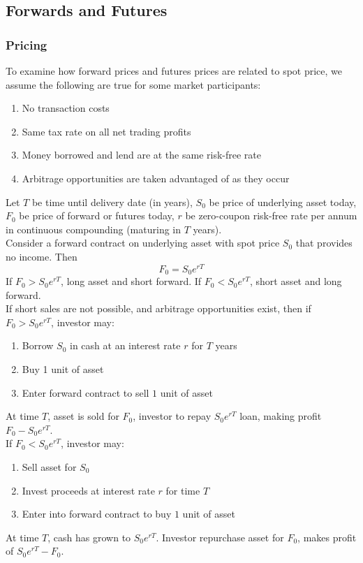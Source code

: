 \subsection{Forwards and Futures}

\subsubsection{Pricing}

To examine how forward prices and futures prices are related to spot price, we assume the following are true for some market participants:
\begin{enumerate}[label=\roman*.]
\setlength{\itemsep}{0pt}
\item No transaction costs
\item Same tax rate on all net trading profits
\item Money borrowed and lend are at the same risk-free rate
\item Arbitrage opportunities are taken advantaged of as they occur
\end{enumerate}

Let $T$ be time until delivery date (in years), $S_0$ be price of underlying asset today, $F_0$ be price of forward or futures today, $r$ be zero-coupon risk-free rate per annum in continuous compounding (maturing in $T$ years).\\

Consider a forward contract on underlying asset with spot price $S_0$ that provides no income. Then
\begin{equation}
F_0 = S_0 e^{rT} \nonumber
\end{equation}
If $F_0 > S_0 e^{rT}$, long asset and short forward. If $F_0 < S_0 e^{rT}$, short asset and long forward.\\
If short sales are not possible, and arbitrage opportunities exist, then if $F_0 > S_0 e^{rT}$, investor may:
\begin{enumerate}[label=\arabic*.]
\setlength{\itemsep}{0pt}
\item Borrow $S_0$ in cash at an interest rate $r$ for $T$ years
\item Buy 1 unit of asset
\item Enter forward contract to sell $1$ unit of asset
\end{enumerate}
At time $T$, asset is sold for $F_0$, investor to repay $S_0 e^{rT}$ loan, making profit $F_0 - S_0 e^{rT}$.\\
If $F_0 < S_0 e^{rT}$, investor may:
\begin{enumerate}[label=\arabic*.]
\setlength{\itemsep}{0pt}
\item Sell asset for $S_0$
\item Invest proceeds at interest rate $r$ for time $T$
\item Enter into forward contract to buy $1$ unit of asset
\end{enumerate}
At time $T$, cash has grown to $S_0 e^{rT}$. Investor repurchase asset for $F_0$, makes profit of $S_0 e^{rT} - F_0$.\\

